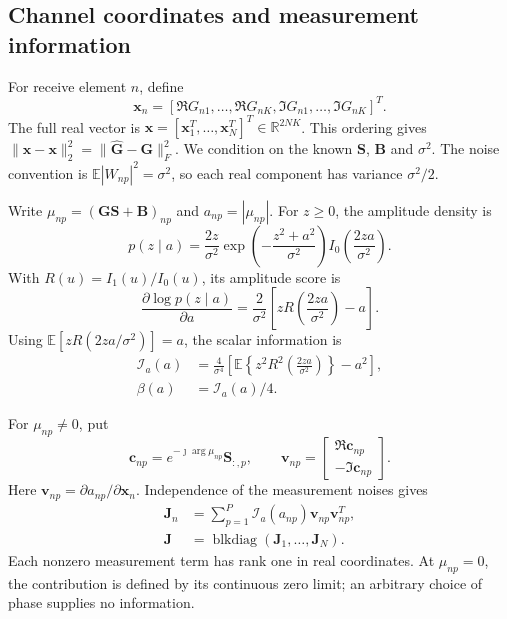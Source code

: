 \documentclass[journal]{IEEEtran}
\begin{document}
\subsection{Channel coordinates and measurement information}

For receive element $n$, define
\begin{equation}
\mathbf x_n=
 [\Re G_{n1},\ldots,\Re G_{nK},
  \Im G_{n1},\ldots,\Im G_{nK}]^T.
\end{equation}
The full real vector is
$\mathbf x=[\mathbf x_1^T,\ldots,\mathbf x_N^T]^T\in\mathbb R^{2NK}$.
This ordering gives
$\|\widehat{\mathbf x}-\mathbf x\|_2^2
=\|\widehat{\mathbf G}-\mathbf G\|_F^2$.
We condition on the known $\mathbf S$, $\mathbf B$ and $\sigma^2$.
The noise convention is $\mathbb E|W_{np}|^2=\sigma^2$, so each real
component has variance $\sigma^2/2$.

Write $\mu_{np}=(\mathbf G\mathbf S+\mathbf B)_{np}$ and
$a_{np}=|\mu_{np}|$. For $z\geq0$, the amplitude density is
\begin{equation}
p(z\mid a)=\frac{2z}{\sigma^2}
 \exp\!\left(-\frac{z^2+a^2}{\sigma^2}\right)
 I_0\!\left(\frac{2za}{\sigma^2}\right).
\end{equation}
With $R(u)=I_1(u)/I_0(u)$, its amplitude score is
\begin{equation}
\frac{\partial\log p(z\mid a)}{\partial a}
=\frac{2}{\sigma^2}
 \left[zR\!\left(\frac{2za}{\sigma^2}\right)-a\right].
\end{equation}
Using $\mathbb E[zR(2za/\sigma^2)]=a$, the scalar information is
\begin{align}
\mathcal I_a(a)
&=\frac{4}{\sigma^4}
 \left[\mathbb E\!\left\{z^2R^2\!\left(\frac{2za}{\sigma^2}\right)\right\}
 -a^2\right],
\label{eq:revision-scalar-information}\\
\beta(a)&=\mathcal I_a(a)/4.
\end{align}

For $\mu_{np}\ne0$, put
\begin{equation}
\mathbf c_{np}=e^{-\jmath\arg\mu_{np}}\mathbf S_{:,p},
\qquad
\mathbf v_{np}=
\begin{bmatrix}\Re\mathbf c_{np}\\-\Im\mathbf c_{np}\end{bmatrix}.
\end{equation}
Here $\mathbf v_{np}=\partial a_{np}/\partial\mathbf x_n$.
Independence of the measurement noises gives
\begin{align}
\mathbf J_n&=\sum_{p=1}^{P}
  \mathcal I_a(a_{np})\mathbf v_{np}\mathbf v_{np}^T,\\
\mathbf J&=\operatorname{blkdiag}
 (\mathbf J_1,\ldots,\mathbf J_N).
\label{eq:revision-real-fisher}
\end{align}
Each nonzero measurement term has rank one in real coordinates. At
$\mu_{np}=0$, the contribution is defined by its continuous zero limit;
an arbitrary choice of phase supplies no information.
\end{document}
